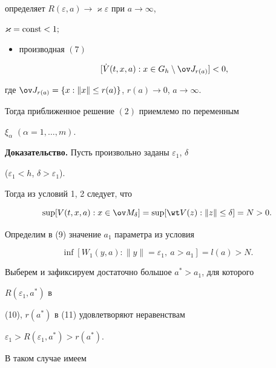 {определяет $R(\varepsilon,a)\to\varkappa\varepsilon$ при $a\to\infty$, 


$\varkappa=\operatorname{const}<1;$ 


\begin{itemize} 


\item[4)] производная $(7)$ 


\begin{equation} 


[\Dot V(t,x,a):x\in G_h\setminus\ov J_{r(a)}]<0, 


\end{equation} 


\end{itemize} 


где $\ov J_{r(a)}=\{x:\|x\|\le r(a)\}$, $r(a)\to 0$, $a\to\infty$. 





\noindent Тогда приближенное решение $(2)$ приемлемо по переменным


$\xi_\alpha$ $(\alpha=1,\dotsc,m)$. 


} 


\medskip 


 


{\bf Доказательство.} Пусть произвольно заданы $\varepsilon_1$, $\delta$ 


($\varepsilon_1<h$, $\delta>\varepsilon_1$). 


Тогда из условий 1, 2 следует, что 


$$ 


\sup[V(t,x,a):x\in\ov M_\delta]=\sup[\wt V(z):\|z\|\le\delta]=N>0. 


$$  


Определим в (9) значение $a_1$ параметра из условия 


\begin{equation} 


\inf[W_1(y,a):\|y\|=\varepsilon_1,\ a>a_1]=l(a)>N. 


\end{equation} 


Выберем и зафиксируем достаточно большое $a^*>a_1$, для которого 


$R(\varepsilon_1,a^*)$ в


(10), $r(a^*)$ в (11) удовлетворяют неравенствам 


$\varepsilon_1>R(\varepsilon_1,a^*)>r(a^*)$. 


В таком случае имеем 


